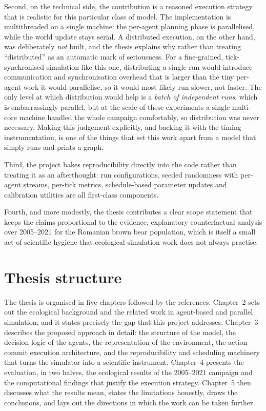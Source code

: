 Second, on the technical side, the contribution is a reasoned execution strategy that is realistic for this particular class of model. The implementation is multithreaded on a single machine: the per-agent planning phase is parallelised, while the world update stays serial. A distributed execution, on the other hand, was deliberately \emph{not} built, and the thesis explains why rather than treating ``distributed'' as an automatic mark of seriousness. For a fine-grained, tick-synchronised simulation like this one, distributing a single run would introduce communication and synchronisation overhead that is larger than the tiny per-agent work it would parallelise, so it would most likely run slower, not faster. The only level at which distribution would help is a \emph{batch of independent runs}, which is embarrassingly parallel, but at the scale of these experiments a single multi-core machine handled the whole campaign comfortably, so distribution was never necessary. Making this judgement explicitly, and backing it with the timing instrumentation, is one of the things that set this work apart from a model that simply runs and prints a graph.

Third, the project bakes reproducibility directly into the code rather than treating it as an afterthought: run configurations, seeded randomness with per-agent streams, per-tick metrics, schedule-based parameter updates and calibration utilities are all first-class components.

Fourth, and more modestly, the thesis contributes a clear scope statement that keeps the claims proportional to the evidence, explanatory counterfactual analysis over 2005--2021 for the Romanian brown bear population, which is itself a small act of scientific hygiene that ecological simulation work does not always practise.

\section{Thesis structure}

The thesis is organised in five chapters followed by the references. Chapter~2 sets out the ecological background and the related work in agent-based and parallel simulation, and it states precisely the gap that this project addresses. Chapter~3 describes the proposed approach in detail: the structure of the model, the decision logic of the agents, the representation of the environment, the action--commit execution architecture, and the reproducibility and scheduling machinery that turns the simulator into a scientific instrument. Chapter~4 presents the evaluation, in two halves, the ecological results of the 2005--2021 campaign and the computational findings that justify the execution strategy. Chapter~5 then discusses what the results mean, states the limitations honestly, draws the conclusions, and lays out the directions in which the work can be taken further.


